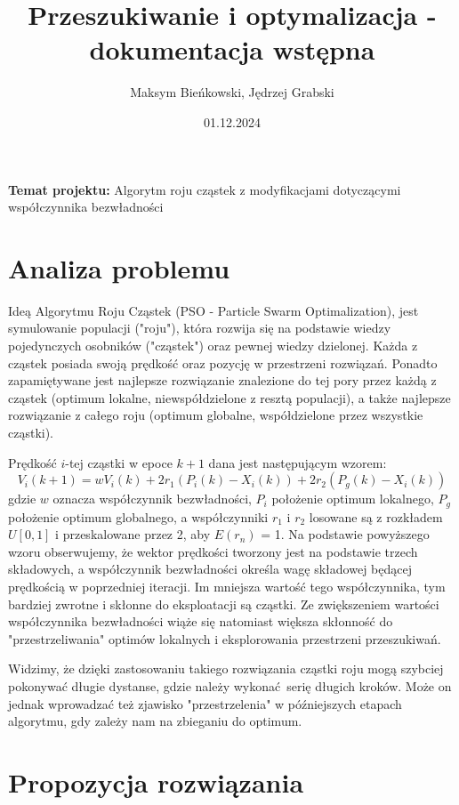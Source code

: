 \documentclass[12pt]{article}
\title{Przeszukiwanie i optymalizacja - dokumentacja wstępna}
\author{Maksym Bieńkowski, Jędrzej Grabski}
\date{01.12.2024}
\begin{document}
\maketitle
\begin{centering}
	\textbf{Temat projektu: }Algorytm roju cząstek z modyfikacjami dotyczącymi współczynnika bezwładności
\end{centering}

\section{Analiza problemu}

Ideą Algorytmu Roju Cząstek (PSO - Particle Swarm Optimalization), jest symulowanie populacji ("roju"),
która rozwija się na podstawie wiedzy pojedynczych osobników ("cząstek") oraz pewnej wiedzy dzielonej.
Każda z cząstek posiada swoją prędkość oraz pozycję w przestrzeni rozwiązań.
Ponadto zapamiętywane jest najlepsze rozwiązanie znalezione do tej pory przez każdą z cząstek (optimum lokalne, niewspółdzielone
z resztą populacji), a także najlepsze rozwiązanie z całego roju (optimum globalne, współdzielone przez wszystkie cząstki).

Prędkość \(i\)-tej cząstki w epoce \(k+1\) dana jest następującym wzorem:\[V_i(k+1) = wV_i(k) + 2 r_1(P_i(k) - X_i(k)) + 2 r_2(P_g(k) - X_i(k))\]
gdzie \(w\) oznacza współczynnik bezwładności, \(P_i\) położenie optimum lokalnego, \(P_g\) położenie optimum globalnego, a współczynniki \(r_1\) i \(r_2\)
losowane są z rozkładem \(U[0, 1]\) i przeskalowane przez 2, aby \(E(r_n)\) = 1. Na podstawie powyższego wzoru obserwujemy,
że wektor prędkości tworzony jest na podstawie trzech składowych, a współczynnik bezwładności określa wagę składowej będącej
prędkością w poprzedniej iteracji. Im mniejsza wartość tego współczynnika, tym bardziej zwrotne i skłonne do eksploatacji są cząstki.
Ze zwiększeniem wartości współczynnika bezwładności wiąże się natomiast większa skłonność do "przestrzeliwania" optimów lokalnych i eksplorowania przestrzeni
przeszukiwań.

Widzimy, że dzięki zastosowaniu takiego rozwiązania cząstki roju mogą szybciej pokonywać długie dystanse,
gdzie należy wykonać serię długich kroków. Może on jednak wprowadzać też zjawisko "przestrzelenia" w późniejszych etapach
algorytmu, gdy zależy nam na zbieganiu do optimum.


\section{Propozycja rozwiązania}
\end{document}
